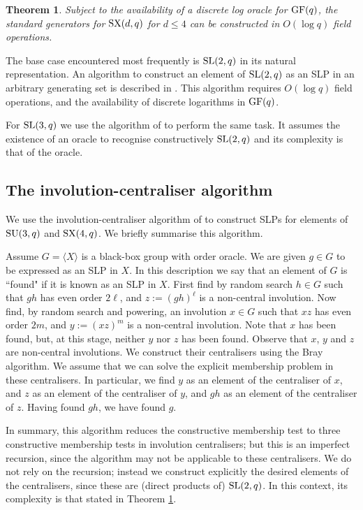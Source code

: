 \documentclass[12pt]{article}
\newtheorem{theorem}[definition]{Theorem}
\def\SL{{\rm SL}}
\def\GF{{\rm GF}}
\def\SU{{\rm SU}}
\def\SX{{\rm SX}}
\begin{document}
\begin{theorem}\label{ryba-alg}
Subject to the availability of a discrete log oracle 
for $\GF(q)$, the standard generators for $\SX(d, q)$ 
for $d \leq 4$ can be constructed  
in $O(\log q)$ field operations.
\end{theorem}

The base case encountered most frequently is $\SL(2,q)$ 
in its natural representation.
An algorithm to construct an element of $\SL(2,q)$ as an SLP  
in an arbitrary generating set is described in \cite{Conderetal05}. 
This algorithm requires $O(\log q)$ field operations, and the 
availability  of discrete logarithms in $\GF(q)$.

For $\SL(3,q)$ we use the algorithm of \cite{sl3q}
to perform the same task. 
It assumes the existence of an oracle
to recognise constructively $\SL(2, q)$
and its complexity is that of the oracle.

\subsection{The involution-centraliser algorithm} 
\label{ryba-base}
We use the involution-centraliser algorithm of \cite{Ryba-paper}
to construct SLPs for elements of $\SU(3,q)$  
and $\SX(4, q)$. We briefly summarise 
this algorithm.  

Assume $G = \langle X \rangle$ is a black-box group
with order oracle. We are given 
$g \in G$ to  be expressed as an SLP in $X$.
In this description  we say
that an element of $G$  is ``found" if it is known as an SLP
in $X$. First find by random search $h\in G$ such that
$gh$ has even order $2\ell$, and $z:=(gh)^\ell$ is a non-central
involution. Now  find, by random search and powering, an involution
$x\in G$ such that $xz$ has even order $2m$, and $y:=(xz)^m$ is a
non-central involution. Note that $x$ has been found, but, at this
stage, neither $y$ nor $z$ has been found. 
Observe that $x$, $y$ and $z$
are non-central involutions. 
We construct their centralisers using the Bray algorithm.
We assume that we can  solve the explicit membership problem 
in these centralisers.
In particular, we find $y$ as an element of the centraliser of $x$, 
and $z$ as an
element of the centraliser of $y$, and $gh$ as an element of the
centraliser of $z$. Having found $gh$, we have found $g$.

In summary, this algorithm reduces the constructive
membership test to three constructive membership  tests  in involution
centralisers;  but  this is an imperfect recursion, since  the 
algorithm may not be applicable to  these centralisers. 
We do not rely on the recursion; instead we construct
explicitly the desired elements of the centralisers, 
since these are (direct products of) $\SL(2,q)$.
In this context, its complexity is that stated
in Theorem \ref{ryba-alg}.
\end{document}
